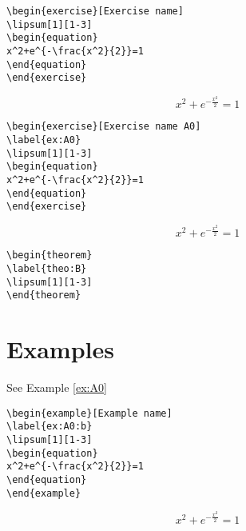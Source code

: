 \begin{verbatim}
\begin{exercise}[Exercise name]
\lipsum[1][1-3]
\begin{equation}
x^2+e^{-\frac{x^2}{2}}=1
\end{equation}
\end{exercise}
\end{verbatim}
\begin{exercise}
\lipsum[1][1-3]
\begin{equation}
x^2+e^{-\frac{x^2}{2}}=1
\end{equation}
\end{exercise}

\begin{verbatim}
\begin{exercise}[Exercise name A0]
\label{ex:A0}
\lipsum[1][1-3]
\begin{equation}
x^2+e^{-\frac{x^2}{2}}=1
\end{equation}
\end{exercise}
\end{verbatim}
\begin{exercise}
\label{ex:A0}
\lipsum[1][1-3]
\begin{equation}
x^2+e^{-\frac{x^2}{2}}=1
\end{equation}
\end{exercise}

\begin{verbatim}
\begin{theorem}
\label{theo:B}
\lipsum[1][1-3]
\end{theorem}
\end{verbatim}
\begin{theorem}
\label{theo:B}
\lipsum[1][1-3]
\end{theorem}

\section{Examples}
\lipsum[1][1-3]
See Example \ref{ex:A0}

\begin{verbatim}
\begin{example}[Example name]
\label{ex:A0:b}
\lipsum[1][1-3]
\begin{equation}
x^2+e^{-\frac{x^2}{2}}=1
\end{equation}
\end{example}
\end{verbatim}
\begin{example}
\label{ex:A0:b}
\lipsum[1][1-3]
\begin{equation}
x^2+e^{-\frac{x^2}{2}}=1
\end{equation}
\end{example}

